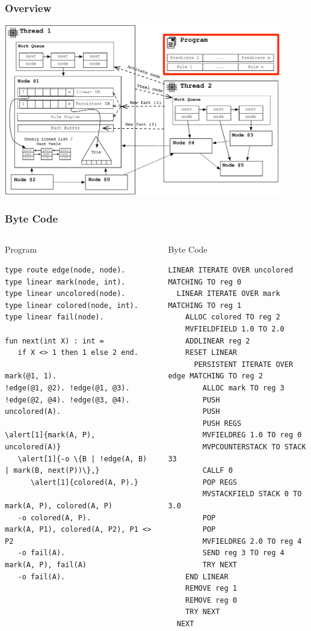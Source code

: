 \documentclass{beamer}
\let\oldalert\alert
\renewcommand{\alert}[2][]{%
  \if\relax\detokenize{#1}\relax%
    \oldalert{#2}%
  \else
    \oldalert<#1>{#2}%
  \fi}
\begin{document}
\begin{frame}[fragile]
   \frametitle{Overview}
   \includegraphics[height=7.5cm]{overview2.pdf}
\end{frame}

\begin{frame}[fragile]
   \frametitle{Byte Code}
   \begin{columns}[t]
     \begin{block}{Program}
       \begin{Verbatim}[fontsize=\tiny,commandchars=\\\{\},frame=single]
type route edge(node, node).
type linear mark(node, int).
type linear uncolored(node).
type linear colored(node, int).
type linear fail(node).

fun next(int X) : int =
   if X <> 1 then 1 else 2 end.

mark(@1, 1).
!edge(@1, @2). !edge(@1, @3).
!edge(@2, @4). !edge(@3, @4).
uncolored(A).

\alert[1]{mark(A, P), uncolored(A)}
   \alert[1]{-o \{B | !edge(A, B) | mark(B, next(P))\},}
      \alert[1]{colored(A, P).}

mark(A, P), colored(A, P)
   -o colored(A, P).
mark(A, P1), colored(A, P2), P1 <> P2
   -o fail(A).
mark(A, P), fail(A)
   -o fail(A).
\end{Verbatim}
     \end{block}
   \begin{block}{Byte Code}
\begin{Verbatim}[fontsize=\tiny]
LINEAR ITERATE OVER uncolored MATCHING TO reg 0
  LINEAR ITERATE OVER mark MATCHING TO reg 1
    ALLOC colored TO reg 2
    MVFIELDFIELD 1.0 TO 2.0
    ADDLINEAR reg 2
    RESET LINEAR
      PERSISTENT ITERATE OVER edge MATCHING TO reg 2
        ALLOC mark TO reg 3
        PUSH
        PUSH
        PUSH REGS
        MVFIELDREG 1.0 TO reg 0
        MVPCOUNTERSTACK TO STACK 33
        CALLF 0
        POP REGS
        MVSTACKFIELD STACK 0 TO 3.0
        POP
        POP
        MVFIELDREG 2.0 TO reg 4
        SEND reg 3 TO reg 4
        TRY NEXT
    END LINEAR
    REMOVE reg 1
    REMOVE reg 0
    TRY NEXT
  NEXT
\end{Verbatim}
   \end{block}
   \end{columns}
\end{frame}
\end{document}
